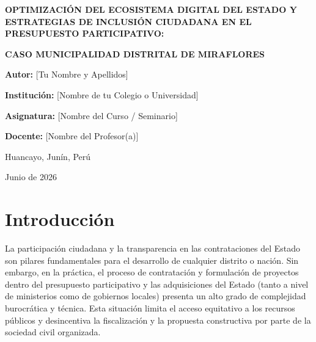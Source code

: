 \documentclass[12pt,a4paper]{article}
\begin{document}
\begin{titlepage}
    \centering
    \vspace*{2cm}
    {\Large\bfseries OPTIMIZACIÓN DEL ECOSISTEMA DIGITAL DEL ESTADO Y ESTRATEGIAS DE INCLUSIÓN CIUDADANA EN EL PRESUPUESTO PARTICIPATIVO:\par}
    \vspace{0.5cm}
    {\Large\bfseries CASO MUNICIPALIDAD DISTRITAL DE MIRAFLORES\par}
    \vspace{2.5cm}
    {\large \textbf{Autor:} [Tu Nombre y Apellidos]\par}
    \vspace{1.5cm}
    {\large \textbf{Institución:} [Nombre de tu Colegio o Universidad]\par}
    \vspace{0.5cm}
    {\large \textbf{Asignatura:} [Nombre del Curso / Seminario]\par}
    \vspace{0.5cm}
    {\large \textbf{Docente:} [Nombre del Profesor(a)]\par}
    \vfill
    {\large Huancayo, Junín, Perú\par}
    {\large Junio de 2026\par}
\end{titlepage}

\newpage

\renewcommand{\contentsname}{2. Índice}
\tableofcontents
\newpage

\section*{Introducción}

La participación ciudadana y la transparencia en las contrataciones del Estado son pilares fundamentales para el desarrollo de cualquier distrito o nación. Sin embargo, en la práctica, el proceso de contratación y formulación de proyectos dentro del presupuesto participativo y las adquisiciones del Estado (tanto a nivel de ministerios como de gobiernos locales) presenta un alto grado de complejidad burocrática y técnica. Esta situación limita el acceso equitativo a los recursos públicos y desincentiva la fiscalización y la propuesta constructiva por parte de la sociedad civil organizada.
\end{document}
